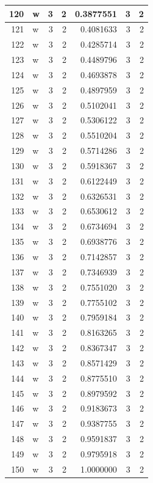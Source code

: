 \documentclass[
  letterpaper,
  DIV=11,
  numbers=noendperiod]{scrreprt}
\begin{document}
\begin{table}
\begin{tabular}[t]{r|l|r|r|r|r|r}
\hline
120 & w & 3 & 2 & 0.3877551 & 3 & 2\\
\hline
121 & w & 3 & 2 & 0.4081633 & 3 & 2\\
\hline
122 & w & 3 & 2 & 0.4285714 & 3 & 2\\
\hline
123 & w & 3 & 2 & 0.4489796 & 3 & 2\\
\hline
124 & w & 3 & 2 & 0.4693878 & 3 & 2\\
\hline
125 & w & 3 & 2 & 0.4897959 & 3 & 2\\
\hline
126 & w & 3 & 2 & 0.5102041 & 3 & 2\\
\hline
127 & w & 3 & 2 & 0.5306122 & 3 & 2\\
\hline
128 & w & 3 & 2 & 0.5510204 & 3 & 2\\
\hline
129 & w & 3 & 2 & 0.5714286 & 3 & 2\\
\hline
130 & w & 3 & 2 & 0.5918367 & 3 & 2\\
\hline
131 & w & 3 & 2 & 0.6122449 & 3 & 2\\
\hline
132 & w & 3 & 2 & 0.6326531 & 3 & 2\\
\hline
133 & w & 3 & 2 & 0.6530612 & 3 & 2\\
\hline
134 & w & 3 & 2 & 0.6734694 & 3 & 2\\
\hline
135 & w & 3 & 2 & 0.6938776 & 3 & 2\\
\hline
136 & w & 3 & 2 & 0.7142857 & 3 & 2\\
\hline
137 & w & 3 & 2 & 0.7346939 & 3 & 2\\
\hline
138 & w & 3 & 2 & 0.7551020 & 3 & 2\\
\hline
139 & w & 3 & 2 & 0.7755102 & 3 & 2\\
\hline
140 & w & 3 & 2 & 0.7959184 & 3 & 2\\
\hline
141 & w & 3 & 2 & 0.8163265 & 3 & 2\\
\hline
142 & w & 3 & 2 & 0.8367347 & 3 & 2\\
\hline
143 & w & 3 & 2 & 0.8571429 & 3 & 2\\
\hline
144 & w & 3 & 2 & 0.8775510 & 3 & 2\\
\hline
145 & w & 3 & 2 & 0.8979592 & 3 & 2\\
\hline
146 & w & 3 & 2 & 0.9183673 & 3 & 2\\
\hline
147 & w & 3 & 2 & 0.9387755 & 3 & 2\\
\hline
148 & w & 3 & 2 & 0.9591837 & 3 & 2\\
\hline
149 & w & 3 & 2 & 0.9795918 & 3 & 2\\
\hline
150 & w & 3 & 2 & 1.0000000 & 3 & 2\\

\end{tabular}
\end{table}
\end{document}
